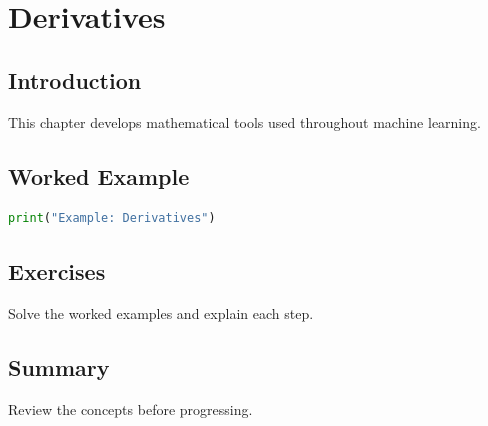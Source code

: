 \chapter{Derivatives}
\label{chap:vol4-15}



\section{Introduction}
This chapter develops mathematical tools used throughout machine learning.

\section{Worked Example}
\begin{lstlisting}[language=Python]
print("Example: Derivatives")
\end{lstlisting}

\section{Exercises}
\begin{exercise}
Solve the worked examples and explain each step.
\end{exercise}

\section{Summary}
Review the concepts before progressing.

